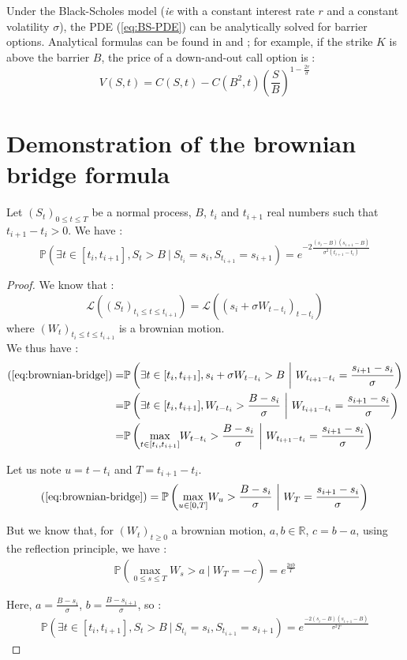 \documentclass[a4paper,11pt,english]{book}
\begin{document}
Under the Black-Scholes model (\textit{ie} with a constant interest rate $r$ and a constant volatility $\sigma$), the PDE (\ref{eq:BS-PDE}) can be analytically solved for barrier options. Analytical formulas can be found in \cite{hull2016options} and \cite{wilmott1998sons} ; for example, if the strike $K$ is above the barrier $B$, the price of a down-and-out call option is :
$$V(S,t)=C(S,t)-C(B^2,t)(\frac{S}{B})^{1-\frac{2r}{\sigma}}$$

\section{Demonstration of the brownian bridge formula}
\label{appendix:brownian-bridge}
Let $(S_t)_{0 \leq t \leq T}$ be a normal process, $B$, $t_i$ and $t_{i+1}$ real numbers such that $t_{i+1}-t_i>0$. We have : 
\begin{equation}
    \mathbb{P}(\exists t \in [t_i,t_{i+1}],S_t>B~|~S_{t_i}=s_i,S_{t_{i+1}}=s_{i+1}) = e^{-2 \frac{(s_i-B)(s_{i+1}-B)}{\sigma^2(t_{i+1}-t_i)}}
    \label{eq:brownian-bridge}
\end{equation}
    
\begin{proof}
We know that :
$$\mathcal{L}((S_t)_{t_i \leq t \leq t_{i+1}})=\mathcal{L}((s_i+\sigma W_{t-t_i})_{t-t_i})$$
where $(W_t)_{t_i \leq t \leq t_{i+1}}$ is a brownian motion.\\

We thus have :
$$\begin{aligned}
(\ref{eq:brownian-bridge}) = & \mathbb{P}\left(\exists t \in [t_i,t_{i+1}],s_i+\sigma W_{t-t_i}>B~\bigg\vert~W_{t_{i+1}-t_i}=\frac{s_{i+1}-s_i}{\sigma}\right) \\
= & \mathbb{P}\left(\exists t \in [t_i,t_{i+1}],W_{t-t_i}>\frac{B-s_i}{\sigma}~\bigg\vert~W_{t_{i+1}-t_i}=\frac{s_{i+1}-s_i}{\sigma}\right)\\
= & \mathbb{P}\left(\underset{t \in [t_i,t_{i+1}]}{\max} W_{t-t_i}>\frac{B-s_i}{\sigma}~\bigg\vert~W_{t_{i+1}-t_i}=\frac{s_{i+1}-s_i}{\sigma}\right)
\end{aligned}$$

Let us note $u=t-t_i$ and $T=t_{i+1}-t_{i}$.
$$\begin{aligned}
(\ref{eq:brownian-bridge}) = \mathbb{P}\left(\underset{u \in [0,T]}{\max} W_{u}>\frac{B-s_i}{\sigma}~\bigg\vert~W_{T}=\frac{s_{i+1}-s_i}{\sigma}\right)
\end{aligned}$$

But we know that, for $(W_t)_{t \geq 0}$ a brownian motion, $a,b \in \mathbb{R}$, $c=b-a$, using the reflection principle, we have :
$$\begin{aligned}
\mathbb{P}\left(\underset{0 \leq s \leq T}{\max} W_{s}>a~\bigg\vert~W_{T}=-c\right) = e^{\frac{2ab}{T}}
\end{aligned}$$

Here, $a=\frac{B-s_i}{\sigma}$, $b=\frac{B-s_{i+1}}{\sigma}$, so :
$$\begin{aligned}
\mathbb{P}(\exists t \in [t_i,t_{i+1}],S_t>B~|~S_{t_i}=s_i,S_{t_{i+1}}=s_{i+1}) = e^{\frac{-2(s_i-B)(s_{i+1}-B)}{\sigma^2 T}}
\end{aligned}$$
\end{proof}
\end{document}

